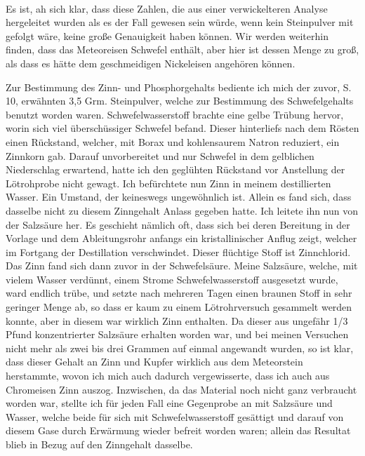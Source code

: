 \documentclass[a4paper, 11pt, oneside]{article}
\begin{document}
\paragraph{}
Es ist, ah sich klar, dass diese Zahlen, die aus einer verwickelteren Analyse hergeleitet wurden als es der Fall gewesen sein würde, wenn kein Steinpulver mit gefolgt wäre, keine große Genauigkeit haben können. Wir werden weiterhin finden, dass das Meteoreisen Schwefel enthält, aber hier ist dessen Menge zu groß, als dass es hätte dem geschmeidigen Nickeleisen angehören können.

Zur Bestimmung des Zinn- und Phosphorgehalts bediente ich mich der zuvor, S. 10, erwähnten 3,5 Grm. Steinpulver, welche zur Bestimmung des Schwefelgehalts benutzt worden waren. Schwefelwasserstoff brachte eine gelbe Trübung hervor, worin sich viel überschüssiger Schwefel befand. Dieser hinterliefs nach dem Rösten einen Rückstand, welcher, mit Borax und kohlensaurem Natron reduziert, ein Zinnkorn gab. Darauf unvorbereitet und nur Schwefel in dem gelblichen Niederschlag erwartend, hatte ich den geglühten Rückstand vor Anstellung der Lötrohprobe nicht gewagt. Ich befürchtete nun Zinn in meinem destillierten Wasser. Ein Umstand, der keineswegs ungewöhnlich ist. Allein es fand sich, dass dasselbe nicht zu diesem Zinngehalt Anlass gegeben hatte. Ich leitete ihn nun von der Salzsäure her. Es geschieht nämlich oft, dass sich bei deren Bereitung in der Vorlage und dem Ableitungsrohr anfangs ein kristallinischer Anflug zeigt, welcher im Fortgang der Destillation verschwindet. Dieser flüchtige Stoff ist Zinnchlorid. Das Zinn fand sich dann zuvor in der Schwefelsäure. Meine Salzsäure, welche, mit vielem Wasser verdünnt, einem Strome Schwefelwasserstoff ausgesetzt wurde, ward endlich trübe, und setzte nach mehreren Tagen einen braunen Stoff in sehr geringer Menge ab, so dass er kaum zu einem Lötrohrversuch gesammelt werden konnte, aber in diesem war wirklich Zinn enthalten. Da dieser aus ungefähr 1/3 Pfund konzentrierter Salzsäure erhalten worden war, und bei meinen Versuchen nicht mehr als zwei bis drei Grammen auf einmal angewandt wurden, so ist klar, dass dieser Gehalt an Zinn und Kupfer wirklich aus dem Meteorstein herstammte, wovon ich mich auch dadurch vergewisserte, dass ich auch aus Chromeisen Zinn auszog. Inzwischen, da das Material noch nicht ganz verbraucht worden war, stellte ich für jeden Fall eine Gegenprobe an mit Salzsäure und Wasser, welche beide für sich mit Schwefelwasserstoff gesättigt und darauf von diesem Gase durch Erwärmung wieder befreit worden waren; allein das Resultat blieb in Bezug auf den Zinngehalt dasselbe.
\end{document}
